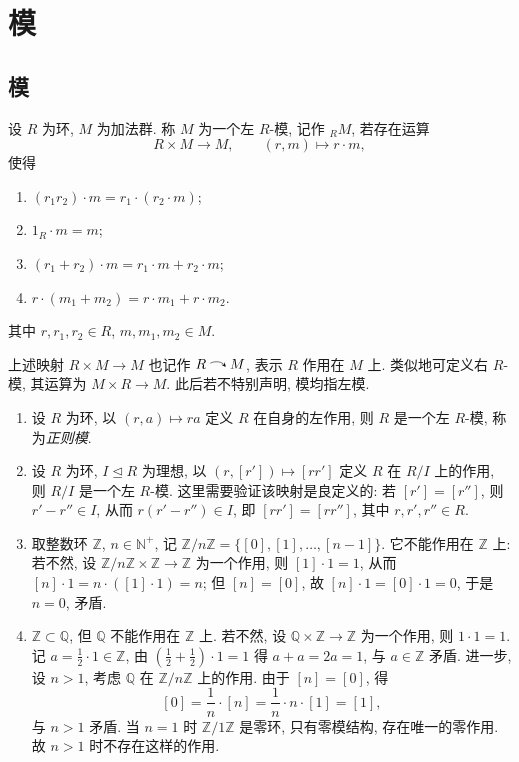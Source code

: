 \section{模}

\subsection{模}

\begin{definition}[左模]\label{def:left-module}
设 $R$ 为环, $M$ 为加法群. 称 $M$ 为一个左 $R$-模, 记作 ${}_R M$, 若存在运算
\[
  R\times M\longrightarrow M,\qquad (r,m)\longmapsto r\cdot m,
\]
使得
\begin{enumerate}
  \item $(r_1r_2)\cdot m=r_1\cdot(r_2\cdot m)$;
  \item $1_R\cdot m=m$;
  \item $(r_1+r_2)\cdot m=r_1\cdot m+r_2\cdot m$;
  \item $r\cdot(m_1+m_2)=r\cdot m_1+r\cdot m_2$.
\end{enumerate}
其中 $r,r_1,r_2\in R$, $m,m_1,m_2\in M$.
\end{definition}

上述映射 $R\times M\to M$ 也记作 $R\acts M$, 表示 $R$ 作用在 $M$ 上.
类似地可定义右 $R$-模, 其运算为 $M\times R\to M$. 此后若不特别声明, 模均指左模.

\begin{example}\label{ex:regular-module}
\mbox{}\par\vspace{-0.2em}
\begin{enumerate}
  \item 设 $R$ 为环, 以 $(r,a)\mapsto ra$ 定义 $R$ 在自身的左作用, 则 $R$ 是一个左 $R$-模,
  称为\emph{正则模}.
  \item 设 $R$ 为环, $I\trianglelefteq R$ 为理想, 以 $(r,[r'])\mapsto[rr']$ 定义 $R$ 在 $R/I$ 上的作用,
  则 $R/I$ 是一个左 $R$-模. 这里需要验证该映射是良定义的:
  若 $[r']=[r'']$, 则 $r'-r''\in I$, 从而 $r(r'-r'')\in I$, 即 $[rr']=[rr'']$,
  其中 $r,r',r''\in R$.
  \item 取整数环 $\mathbb{Z}$, $n\in\mathbb{N}^+$, 记 $\mathbb{Z}/n\mathbb{Z}=\{[0],[1],\dots,[n-1]\}$.
  它不能作用在 $\mathbb{Z}$ 上: 若不然, 设 $\mathbb{Z}/n\mathbb{Z}\times\mathbb{Z}\to\mathbb{Z}$ 为一个作用,
  则 $[1]\cdot1=1$, 从而 $[n]\cdot1=n\cdot([1]\cdot1)=n$; 但 $[n]=[0]$, 故 $[n]\cdot1=[0]\cdot1=0$,
  于是 $n=0$, 矛盾.
  \item $\mathbb{Z}\subset\mathbb{Q}$, 但 $\mathbb{Q}$ 不能作用在 $\mathbb{Z}$ 上.
  若不然, 设 $\mathbb{Q}\times\mathbb{Z}\to\mathbb{Z}$ 为一个作用, 则 $1\cdot 1=1$.
  记 $a=\frac12\cdot 1\in\mathbb{Z}$, 由 $\left(\frac12+\frac12\right)\cdot 1=1$ 得
  $a+a=2a=1$, 与 $a\in\mathbb{Z}$ 矛盾.
  进一步, 设 $n>1$, 考虑 $\mathbb{Q}$ 在 $\mathbb{Z}/n\mathbb{Z}$ 上的作用.
  由于 $[n]=[0]$, 得
  \[
    [0]=\frac1n\cdot[n]=\frac1n\cdot n\cdot[1]=[1],
  \]
  与 $n>1$ 矛盾. 当 $n=1$ 时 $\mathbb{Z}/1\mathbb{Z}$ 是零环, 只有零模结构, 存在唯一的零作用.
  故 $n>1$ 时不存在这样的作用.
\end{enumerate}
\end{example}

